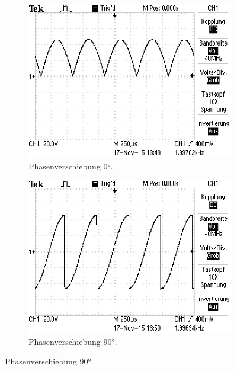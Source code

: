\begin{figure}
  \centering
  \begin{subfigure}{0.48\textwidth}
    \centering
    \includegraphics[width=\textwidth]{bilder/Ohne Rauschen/1.JPG}
    \caption{Phasenverschiebung 0°.}
    \label{fig:bild1}
  \end{subfigure}
  \begin{subfigure}{0.48\textwidth}
    \centering
    \includegraphics[width=\textwidth]{bilder/Ohne Rauschen/2.JPG}
    \caption{Phasenverschiebung 90°.}
    \label{fig:bild2}
  \end{subfigure}
\end{figure}
